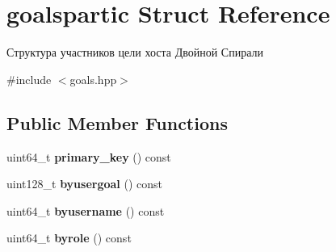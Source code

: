 \hypertarget{structgoalspartic}{}\section{goalspartic Struct Reference}
\label{structgoalspartic}


Структура участников цели хоста Двойной Спирали  




{\ttfamily \#include $<$goals.\+hpp$>$}

\subsection*{Public Member Functions}
\begin{DoxyCompactItemize}
\item 
\mbox{\label{structgoalspartic_aafafd092a2217ce1b8149850841d1ba8}} 
uint64\+\_\+t {\bfseries primary\+\_\+key} () const
\item 
\mbox{\label{structgoalspartic_a1b4b454d41971172fac09aa441f44767}} 
uint128\+\_\+t {\bfseries byusergoal} () const
\item 
\mbox{\label{structgoalspartic_a642ff9cef3c400e4e65024c5eb6daabb}} 
uint64\+\_\+t {\bfseries byusername} () const
\item 
\mbox{\label{structgoalspartic_a7b9500ef1b7b296b0d070125dcff7606}} 
uint64\+\_\+t {\bfseries byrole} () const
\end{DoxyCompactItemize}
